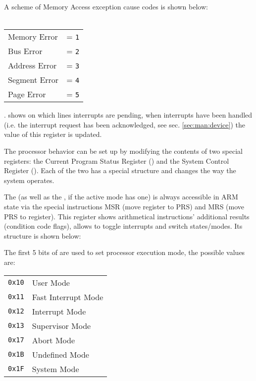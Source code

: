A scheme of Memory Access exception cause codes is shown below:
\\
\\
\begin{tabular}{ll}
Memory Error & = \texttt{1}\\
Bus Error & = \texttt{2}\\
Address Error & = \texttt{3}\\
Segment Error & = \texttt{4}\\
Page Error & = \texttt{5}\\
\end{tabular}

. shows on which lines interrupts are pending, when interrupts have been handled (i.e. the interrupt request has been acknowledged, see sec. \ref{sec:man:device}) the value of this register is updated.


The processor behavior can be set up by modifying the contents of two special registers: the Current Program Status Register () and the System Control Register ().
Each of the two has a special structure and changes the way the system operates.


The  (as well as the , if the active mode has one) is always accessible in ARM state via the special instructions MSR (move register to PRS) and MRS (move PRS to register). This register shows arithmetical instructions' additional results (condition code flags), allows to toggle interrupts and switch states/modes. Its structure is shown below:

\vspace{5px}
\begin{adjustbox}{center}

\end{adjustbox}
\vspace{5px}



The first 5 bits of  are used to set processor execution mode, the possible values are:
\\

\begin{tabular}{r|l}
\texttt{0x10} & User Mode \\
\texttt{0x11} & Fast Interrupt Mode \\
\texttt{0x12} & Interrupt Mode \\
\texttt{0x13} & Supervisor Mode \\
\texttt{0x17} & Abort Mode \\
\texttt{0x1B} & Undefined Mode \\
\texttt{0x1F} & System Mode \\
\end{tabular}
\\

